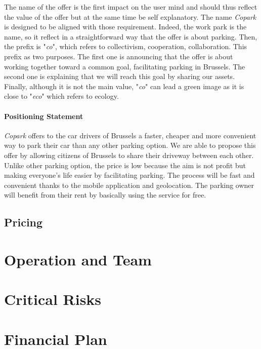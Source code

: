 \documentclass[12pt,a4paper,oneside]{book}
\newcommand{\bp}{\textit{Copark }}
\begin{document}
The name of the offer is the first impact on the user mind and should thus reflect the value of the offer but at the same time be self explanatory. The name \bp is designed to be aligned with those requirement. Indeed, the work park is the name, so it reflect in a straightforward way that the offer is about parking. Then, the prefix is "\textit{co}", which refers to collectivism, cooperation, collaboration. This prefix as two purposes. The first one is announcing that the offer is about working together toward a common goal, facilitating parking in Brussels. The second one is explaining that we will reach this goal by sharing our assets.\\
Finally, although it is not the main value, "\textit{co}" can lead a green image as it is close to "\textit{eco}" which refers to ecology.

\subsubsection{Positioning Statement}

\bp offers to the car drivers of Brussels a faster, cheaper and more convenient way to park their car than any other parking option. We are able to propose this offer by allowing citizens of Brussels to share their driveway between each other. Unlike other parking option, the price is low because the aim is not profit but making everyone's life easier by facilitating parking. The process will be fast and convenient thanks to the mobile application and geolocation. The parking owner will benefit from their rent by basically using the service for free. 

\section{Pricing}

\chapter{Operation and Team}

\chapter{Critical Risks}

\chapter{Financial Plan}



%

\end{document}
